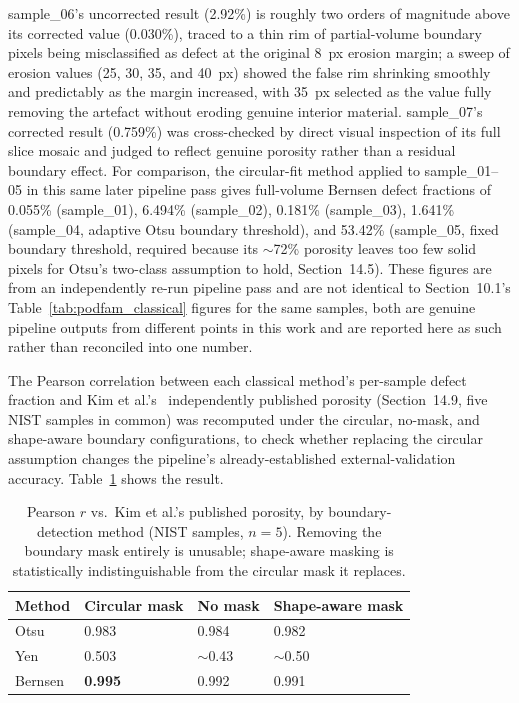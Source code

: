sample\_06's uncorrected result (2.92\%) is roughly two orders of magnitude above its corrected value
(0.030\%), traced to a thin rim of partial-volume boundary pixels being misclassified as defect at the
original 8~px erosion margin; a sweep of erosion values (25, 30, 35, and 40~px) showed the false rim
shrinking smoothly and predictably as the margin increased, with 35~px selected as the value fully
removing the artefact without eroding genuine interior material. sample\_07's corrected result
(0.759\%) was cross-checked by direct visual inspection of its full slice mosaic and judged to reflect
genuine porosity rather than a residual boundary effect. For comparison, the circular-fit method
applied to sample\_01--05 in this same later pipeline pass gives full-volume Bernsen defect fractions
of 0.055\% (sample\_01), 6.494\% (sample\_02), 0.181\% (sample\_03), 1.641\% (sample\_04, adaptive
Otsu boundary threshold), and 53.42\% (sample\_05, fixed boundary threshold, required because its
$\sim$72\% porosity leaves too few solid pixels for Otsu's two-class assumption to hold, Section~14.5).
These figures are from an independently re-run pipeline pass and are not identical to Section~10.1's
Table~\ref{tab:podfam_classical} figures for the same samples, both are genuine pipeline outputs from
different points in this work and are reported here as such rather than reconciled into one number.

The Pearson correlation between each classical method's per-sample defect fraction and Kim et
al.'s~\citep{Kim2017} independently published porosity (Section~14.9, five NIST samples in common)
was recomputed under the circular, no-mask, and shape-aware boundary configurations, to check whether
replacing the circular assumption changes the pipeline's already-established external-validation
accuracy. Table~\ref{tab:mask_r_comparison} shows the result.

\begin{table}[htbp]
\centering
\caption{Pearson $r$ vs.\ Kim et al.'s published porosity, by boundary-detection method (NIST samples,
  $n=5$). Removing the boundary mask entirely is unusable; shape-aware masking is statistically
  indistinguishable from the circular mask it replaces.}
\label{tab:mask_r_comparison}
\begin{tabular}{llll}
\toprule
\textbf{Method} & \textbf{Circular mask} & \textbf{No mask} & \textbf{Shape-aware mask} \\
\midrule
Otsu    & 0.983 & 0.984 & 0.982 \\
Yen     & 0.503 & $\sim$0.43 & $\sim$0.50 \\
Bernsen & \textbf{0.995} & 0.992 & 0.991 \\
\bottomrule
\end{tabular}
\end{table}

